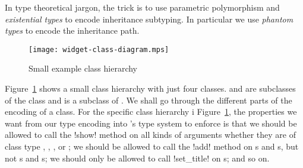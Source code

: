 \documentclass[workingdraft]{usetex-v1}
\begin{document}
In type theoretical jargon, the trick is to use parametric
polymorphism and \emph{existential types} to encode inheritance
subtyping.  In particular we use \emph{phantom types} to encode the
inheritance path.


\begin{figure}[htp]
  \centering
  \texttt{[image: widget-class-diagram.mps]}
  \caption{Small example class hierarchy}
  \label{fig:class-hierarchy}
\end{figure}

Figure~\ref{fig:class-hierarchy} shows a small class hierarchy with
just four classes.  and  are
subclasses of the class  and  is a
subclass of .  We shall go through the different
parts of the encoding of a class.  For the specific class hierarchy i
Figure~\ref{fig:class-hierarchy}, the properties we want from our
type encoding into \sml's type system to enforce is that we should be
allowed to call the !show! method on all kinds of arguments whether
they are of class type , ,
, or ; we should be allowed to
call the !add! method on s and
s, but not s and
s; we should only be allowed to call !set_title! on
s; and so on. 
\end{document}
